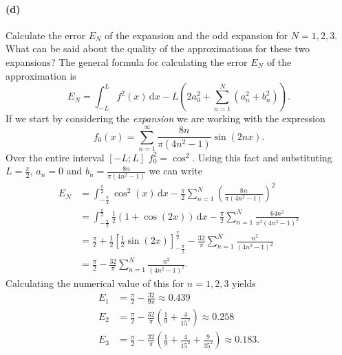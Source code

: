 \paragraph{(d)} Calculate the error $E_N$ of the expansion and the odd expansion for $N = 1,2,3$. What can be said about the quality of the approximations for these two expansions?
\bigbreak
The general formula for calculating the error $E_N$ of the approximation is
\[ 
E_N = \int_{-L}^{L} f^2(x) \, \mathrm{d}x - L \left( 2a_0^2 + \sum_{n = 1}^{N} \left( a_n^2 + b_n^2 \right) \right)
.\]
If we start by considering the \textit{expansion} we are working with the expression
\[ 
  f_0(x) = \sum_{n= 1}^{\infty} \frac{8n}{\pi \left( 4n^2 - 1 \right)} \sin \left( 2nx \right)
.\]
Over the entire interval $[-L; L]$ $f_0^2 = \cos^2$. Using this fact and substituting $L = \frac{\pi}{2}$, $a_n = 0$ and $b_n = \frac{8n}{\pi \left( 4n^2 - 1 \right)}$ we can write
\begin{align*}
  E_N &= \int_{- \frac{\pi}{2}}^{\frac{\pi}{2}} \cos^2(x) \, \mathrm{d}x - \frac{\pi}{2} \sum_{n = 1}^{N} \left( \frac{8n}{\pi \left( 4n^2 -1 \right)} \right)^2 \\
  &= \int_{-\frac{\pi}{2}}^{\frac{\pi}{2}}  \frac{1}{2} \left( 1 + \cos (2x) \right) \, \mathrm{d}x - \frac{\pi}{2} \sum_{n = 1}^{N} \frac{64n^2}{\pi^2 \left( 4n^2 - 1 \right)^2} \\
  &= \frac{\pi}{2} + \frac{1}{2} \left[ \frac{1}{2} \sin \left( 2x \right) \right]_{- \frac{\pi}{2}}^{\frac{\pi}{2}} - \frac{32}{\pi} \sum_{n = 1}^{N} \frac{n^2}{\left( 4n^2 - 1 \right)^2} \\
  &= \frac{\pi}{2} - \frac{32}{\pi} \sum_{n = 1}^{N} \frac{n^2}{\left( 4n^2 - 1 \right)^2}
.\end{align*}
Calculating the numerical value of this for $n = 1,2,3$ yields
\begin{align*}
  E_1 &= \frac{\pi}{2} - \frac{32}{9\pi} \approx \num{0,439} \\
  E_2 &= \frac{\pi}{2} - \frac{32}{\pi} \left( \frac{1}{9} + \frac{4}{15^2} \right) \approx \num{0,258} \\
  E_3 &= \frac{\pi}{2} - \frac{32}{\pi} \left( \frac{1}{9} + \frac{4}{15^2} + \frac{9}{35^2} \right) \approx \num{0,183} 
.\end{align*}

